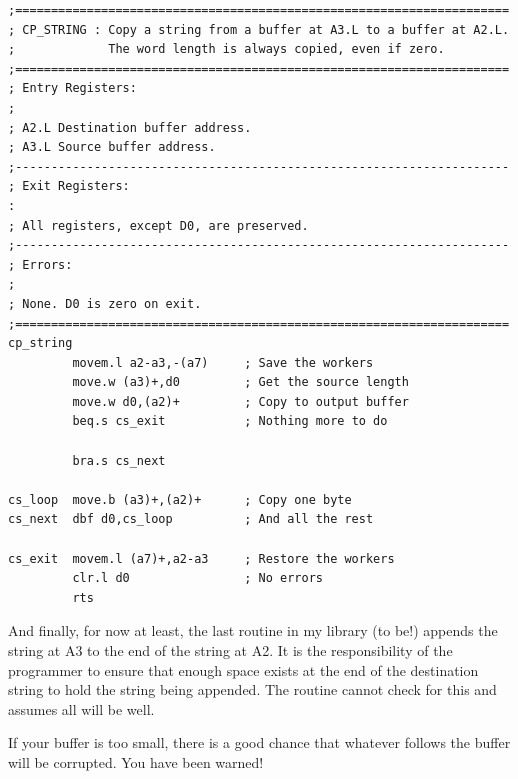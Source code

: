 \begin{lstlisting}[firstnumber=last,caption={QlToday\_pe\_utilities\_asm}]
;=====================================================================
; CP_STRING : Copy a string from a buffer at A3.L to a buffer at A2.L.
;             The word length is always copied, even if zero.
;=====================================================================
; Entry Registers:
;
; A2.L Destination buffer address.
; A3.L Source buffer address.
;---------------------------------------------------------------------
; Exit Registers:
:
; All registers, except D0, are preserved.
;---------------------------------------------------------------------
; Errors:
;
; None. D0 is zero on exit.
;=====================================================================
cp_string
         movem.l a2-a3,-(a7)     ; Save the workers
         move.w (a3)+,d0         ; Get the source length
         move.w d0,(a2)+         ; Copy to output buffer
         beq.s cs_exit           ; Nothing more to do

         bra.s cs_next

cs_loop  move.b (a3)+,(a2)+      ; Copy one byte
cs_next  dbf d0,cs_loop          ; And all the rest

cs_exit  movem.l (a7)+,a2-a3     ; Restore the workers
         clr.l d0                ; No errors
         rts
\end{lstlisting}

And finally, for now at least, the last routine in my library (to
    be!) appends the string at A3 to the end of the string at A2. It is the
    responsibility of the programmer to ensure that enough space exists at the
    end of the destination string to hold the string being appended. The
    routine cannot check for this and assumes all will be well.

If your buffer is too small, there is a good chance that whatever
    follows the buffer will be corrupted. You have been warned!

